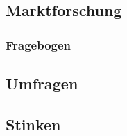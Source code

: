 \documentclass[12pt]{beamer}
\begin{document}
\subsection{Marktforschung}
\begin{frame}
\frametitle{Fragebogen}
\end{frame}
\subsection{Umfragen}

\begin{frame}

\end{frame}

\subsection{Stinken}
\begin{frame}

\end{frame}

\begin{figure}
	\listoffigures
\end{figure}
\end{document}
